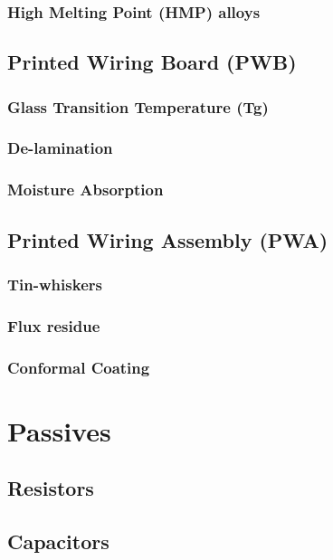 \documentclass{article}
\begin{document}
		
		\subsubsection{High Melting Point (HMP) alloys}
	
	\subsection{Printed Wiring Board (PWB)}
		\subsubsection{Glass Transition Temperature (Tg)}
		\subsubsection{De-lamination}
		\subsubsection{Moisture Absorption}

	\subsection{Printed Wiring Assembly (PWA)}
		\subsubsection{Tin-whiskers}
		\subsubsection{Flux residue}
		\subsubsection{Conformal Coating}

\newpage

\section{Passives}
	\subsection{Resistors}
	
	\subsection{Capacitors}
	
\end{document}
